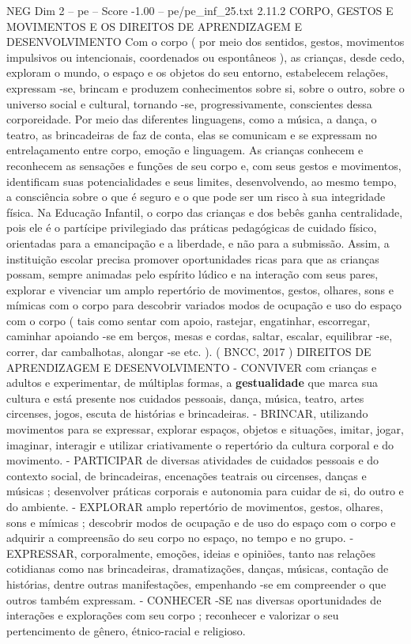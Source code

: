 \begin{textsample}{NEG Dim 2 – pe – Score -1.00 – pe/pe\_inf\_25.txt}  \label{ex:f2_neg_034}
2.11.2 CORPO, GESTOS E MOVIMENTOS E OS DIREITOS DE APRENDIZAGEM E DESENVOLVIMENTO Com o corpo ( por meio dos sentidos, gestos, movimentos impulsivos ou intencionais, coordenados ou espontâneos ), as crianças, desde cedo, exploram o mundo, o espaço e os objetos do seu entorno, estabelecem relações, expressam -se, brincam e produzem conhecimentos sobre si, sobre o outro, sobre o universo social e cultural, tornando -se, progressivamente, conscientes dessa corporeidade.
Por meio das diferentes linguagens, como a música, a dança, o teatro, as brincadeiras de faz de conta, elas se comunicam e se expressam no entrelaçamento entre corpo, emoção e linguagem.
As crianças conhecem e reconhecem as sensações e funções de seu corpo e, com seus gestos e movimentos, identificam suas potencialidades e seus limites, desenvolvendo, ao mesmo tempo, a consciência sobre o que é seguro e o que pode ser um risco à sua integridade física.
Na Educação Infantil, o corpo das crianças e dos bebês ganha centralidade, pois ele é o partícipe privilegiado das práticas pedagógicas de cuidado físico, orientadas para a emancipação e a liberdade, e não para a submissão.
Assim, a instituição escolar precisa promover oportunidades ricas para que as crianças possam, sempre animadas pelo espírito lúdico e na interação com seus pares, explorar e vivenciar um amplo repertório de movimentos, gestos, olhares, sons e mímicas com o corpo para descobrir variados modos de ocupação e uso do espaço com o corpo ( tais como sentar com apoio, rastejar, engatinhar, escorregar, caminhar apoiando -se em berços, mesas e cordas, saltar, escalar, equilibrar -se, correr, dar cambalhotas, alongar -se etc. ). ( BNCC, 2017 ) DIREITOS DE APRENDIZAGEM E DESENVOLVIMENTO - CONVIVER com crianças e adultos e experimentar, de múltiplas formas, a \textbf{gestualidade} que marca sua cultura e está presente nos cuidados pessoais, dança, música, teatro, artes circenses, jogos, escuta de histórias e brincadeiras. - BRINCAR, utilizando movimentos para se expressar, explorar espaços, objetos e situações, imitar, jogar, imaginar, interagir e utilizar criativamente o repertório da cultura corporal e do movimento. - PARTICIPAR de diversas atividades de cuidados pessoais e do contexto social, de brincadeiras, encenações teatrais ou circenses, danças e músicas ; desenvolver práticas corporais e autonomia para cuidar de si, do outro e do ambiente. - EXPLORAR amplo repertório de movimentos, gestos, olhares, sons e mímicas ; descobrir modos de ocupação e de uso do espaço com o corpo e adquirir a compreensão do seu corpo no espaço, no tempo e no grupo. - EXPRESSAR, corporalmente, emoções, ideias e opiniões, tanto nas relações cotidianas como nas brincadeiras, dramatizações, danças, músicas, contação de histórias, dentre outras manifestações, empenhando -se em compreender o que outros também expressam. - CONHECER -SE nas diversas oportunidades de interações e explorações com seu corpo ; reconhecer e valorizar o seu pertencimento de gênero, étnico-racial e religioso.

\end{textsample}
